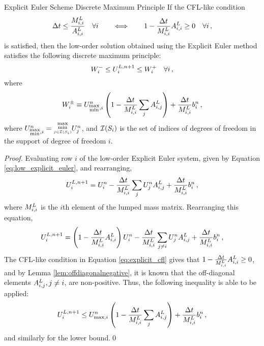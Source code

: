 \begin{theorem}{Explicit Euler Scheme Discrete
  Maximum Principle}
If the CFL-like condition
\begin{equation}\label{eq:explicit_cfl}
   \Delta t \leq \frac{M_{i,i}^L}{A_{i,i}^L}
   \quad\forall i
   \qquad\Longleftrightarrow\qquad
   1 - \frac{\Delta t}{M_{i,i}^L}A_{i,i}^L
     \geq 0\quad\forall i \,,
\end{equation}
is satisfied, then the low-order solution obtained using the Explicit Euler
method satisfies the following discrete maximum principle:
\begin{equation}\label{eq:explicit_dmp}
   W_i^-\leq U_i^{L,n+1}\leq W_i^+\quad\forall i
   \,,
\end{equation}
where
\begin{equation}\label{eq:explicit_bounds}
   W_i^\pm\equiv U_{\substack{\max\\\min},i}^n
     \left(1-\frac{\Delta t}{M_{i,i}^L}
       \sum\limits_jA^L_{i,j}\right)
     + \frac{\Delta t}{M_{i,i}^L}b_i^n \,,
\end{equation}
where $\solutionletter_{\substack{\max\\\min},i}^n =
\substack{\max\\\min\limits_{j\in\indicescell[\support_i]}}\solutionletter_j^n$,
and $\indicescell[\support_i]$ is the set of indices of degrees of freedom in the
support of degree of freedom $i$.
\end{theorem}

\begin{proof}
Evaluating row $i$ of the low-order Explicit Euler system, given by Equation
\eqref{eq:low_explicit_euler}, and rearranging,
\[
   U_i^{L,n+1}
   = U_i^n
   - \frac{\Delta t}{M_{i,i}^L}
       \sum\limits_jU_j^n A^L_{i,j}
   + \frac{\Delta t}{M_{i,i}^L}b_i^n \,,
\]
where $M_{i,i}^L$ is the $i$th element of the lumped mass matrix.
Rearranging this equation,
\[
   U_i^{L,n+1}
   = \left(1-\frac{\Delta t}{M_{i,i}^L}
       A^L_{i,i}\right)U_i^n
   - \frac{\Delta t}{M_{i,i}^L}
       \sum\limits_{j\ne i}U_j^n A^L_{i,j}
   + \frac{\Delta t}{M_{i,i}^L}b_i^n \,,
\]
The CFL-like condition in Equation \eqref{eq:explicit_cfl} gives that
$1-\frac{\Delta t}{M_{i,i}^L}A^L_{i,i} \ge
0$, and by Lemma \ref{lem:offdiagonalnegative}, it is known that the
off-diagonal elements $A^L_{i,j}, j\ne i$, are non-positive.
Thus, the following inequality is able to be applied:
\[
   U_i^{L,n+1}
   \le U_{\max,i}^n
         \left(1-\frac{\Delta t}{M_{i,i}^L}
         \sum\limits_jA^L_{i,j}\right)
   + \frac{\Delta t}{M_{i,i}^L}b_i^n \,,
\]
and similarly for the lower bound.\qed
\end{proof}
